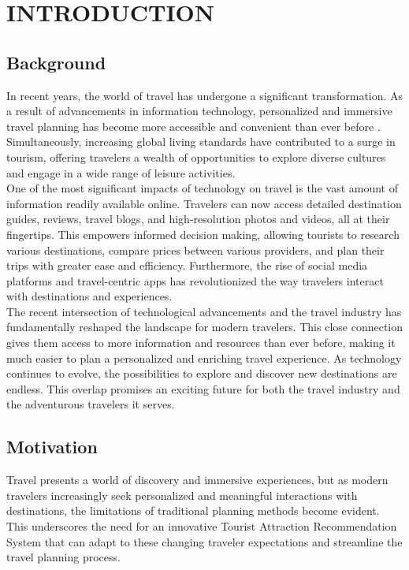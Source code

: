 \chapter{INTRODUCTION}
\section{Background}

    In recent years, the world of travel has undergone a significant transformation. As a result of advancements in information technology, personalized and immersive travel planning has become more accessible and convenient than ever before \cite{berzina2021role}. Simultaneously, increasing global living standards have contributed to a surge in tourism, offering travelers a wealth of opportunities to explore diverse cultures and engage in a wide range of leisure activities. \\
    One of the most significant impacts of technology on travel is the vast amount of information readily available online. Travelers can now access detailed destination guides, reviews, travel blogs, and high-resolution photos and videos, all at their fingertips. This empowers informed decision making, allowing tourists to research various destinations, compare prices between various providers, and plan their trips with greater ease and efficiency. Furthermore, the rise of social media platforms and travel-centric apps has revolutionized the way travelers interact with destinations and experiences. \\
    The recent intersection of technological advancements and the travel industry has fundamentally reshaped the landscape for modern travelers.  This close connection gives them access to more information and resources than ever before, making it much easier to plan a personalized and enriching travel experience. As technology continues to evolve, the possibilities to explore and discover new destinations are endless. This overlap promises an exciting future for both the travel industry and the adventurous travelers it serves.\cite{schuld2015introduction}

\section{Motivation}
    Travel presents a world of discovery and immersive experiences, but as modern travelers increasingly seek personalized and meaningful interactions with destinations, the limitations of traditional planning methods become evident. This underscores the need for an innovative Tourist Attraction Recommendation System that can adapt to these changing traveler expectations and streamline the travel planning process.

